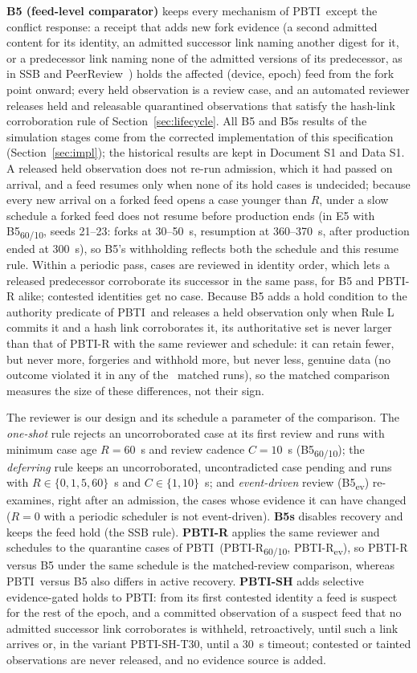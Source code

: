 \documentclass[futureinternet,article,submit,moreauthors]{Definitions/mdpi}
\newcommand{\sys}{PBTI}
\newcommand{\Bhist}{B5\textsubscript{60/10}}
\newcommand{\Bev}{B5\textsubscript{ev}}
\newcommand{\Rhist}{PBTI-R\textsubscript{60/10}}
\newcommand{\Rev}{PBTI-R\textsubscript{ev}}
\begin{document}
\textbf{B5 (feed-level comparator)} keeps every mechanism of \sys\ except the conflict response: a receipt that adds new fork evidence (a second admitted content for its identity, an admitted successor link naming another digest for it, or a predecessor link naming none of the admitted versions of its predecessor, as in SSB and PeerReview~\cite{tarr2019ssb,haeberlen2007peerreview}) holds the affected (device, epoch) feed from the fork point onward; every held observation is a review case, and an automated reviewer releases held and releasable quarantined observations that satisfy the hash-link corroboration rule of Section~\ref{sec:lifecycle}. All B5 and B5s results of the simulation stages come from the corrected implementation of this specification (Section~\ref{sec:impl}); the historical results are kept in Document S1 and Data S1. A released held observation does not re-run admission, which it had passed on arrival, and a feed resumes only when none of its hold cases is undecided; because every new arrival on a forked feed opens a case younger than $R$, under a slow schedule a forked feed does not resume before production ends (in E5 with \Bhist, seeds 21--23: forks at 30--50~s, resumption at 360--370~s, after production ended at 300~s), so B5's withholding reflects both the schedule and this resume rule. Within a periodic pass, cases are reviewed in identity order, which lets a released predecessor corroborate its successor in the same pass, for B5 and PBTI-R alike; contested identities get no case. Because B5 adds a hold condition to the authority predicate of \sys\ and releases a held observation only when Rule L commits it and a hash link corroborates it, its authoritative set is never larger than that of PBTI-R with the same reviewer and schedule: it can retain fewer, but never more, forgeries and withhold more, but never less, genuine data (no outcome violated it in any of the \XSubsetRuns\ matched runs), so the matched comparison measures the size of these differences, not their sign.

The reviewer is our design and its schedule a parameter of the comparison. The \emph{one-shot} rule rejects an uncorroborated case at its first review and runs with minimum case age $R=60$~s and review cadence $C=10$~s (\Bhist); the \emph{deferring} rule keeps an uncorroborated, uncontradicted case pending and runs with $R\in\{0,1,5,60\}$~s and $C\in\{1,10\}$~s; and \emph{event-driven} review (\Bev) re-examines, right after an admission, the cases whose evidence it can have changed ($R=0$ with a periodic scheduler is not event-driven). \textbf{B5s} disables recovery and keeps the feed hold (the SSB rule). \textbf{PBTI-R} applies the same reviewer and schedules to the quarantine cases of \sys\ (\Rhist, \Rev), so PBTI-R versus B5 under the same schedule is the matched-review comparison, whereas \sys\ versus B5 also differs in active recovery. \textbf{PBTI-SH} adds selective evidence-gated holds to \sys: from its first contested identity a feed is suspect for the rest of the epoch, and a committed observation of a suspect feed that no admitted successor link corroborates is withheld, retroactively, until such a link arrives or, in the variant PBTI-SH-T30, until a 30~s timeout; contested or tainted observations are never released, and no evidence source is added.
\end{document}
